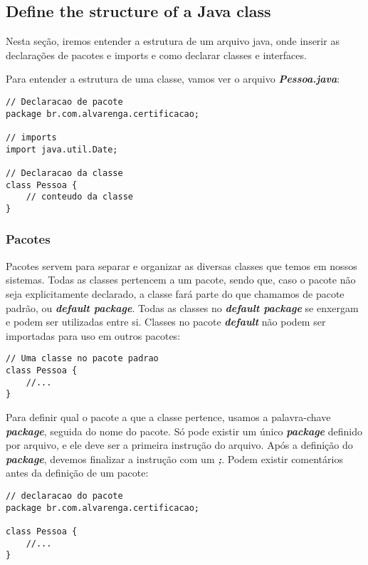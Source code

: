 \documentclass[12pt]{article}
\begin{document}
\subsection{Define the structure of a Java class}

Nesta seção, iremos entender a estrutura de um arquivo java, onde inserir as declarações de pacotes e imports e como declarar classes e interfaces.

Para entender a estrutura de uma classe, vamos ver o arquivo \textbf{\textit{Pessoa.java}}:

\begin{lstlisting}
// Declaracao de pacote
package br.com.alvarenga.certificacao;
	
// imports
import java.util.Date;
	
// Declaracao da classe
class Pessoa {
	// conteudo da classe
}
\end{lstlisting}

\subsubsection{Pacotes}

Pacotes servem para separar e organizar as diversas classes que temos em nossos sistemas. Todas as classes pertencem a um pacote, sendo que, caso o pacote não seja explicitamente declarado, a classe fará parte do que chamamos de pacote padrão, ou \textbf{\textit{default package}}. Todas as classes no \textbf{\textit{default package}} se enxergam e podem ser utilizadas entre si. Classes no pacote \textbf{\textit{default}} não podem ser importadas para uso em outros pacotes:

\begin{lstlisting}
// Uma classe no pacote padrao
class Pessoa {
	//...
}
\end{lstlisting}

Para definir qual o pacote a que a classe pertence, usamos a palavra-chave \textbf{\textit{package}}, seguida do nome do pacote. Só pode existir um único \textbf{\textit{package}} definido por arquivo, e ele deve ser a primeira instrução do arquivo. Após a definição do \textbf{\textit{package}}, devemos finalizar a instrução com um \textbf{\textit{;}}. Podem existir comentários antes da definição de um pacote:

\begin{lstlisting}
// declaracao do pacote
package br.com.alvarenga.certificacao;
	
class Pessoa {
	//...
}
\end{lstlisting}
\end{document}
